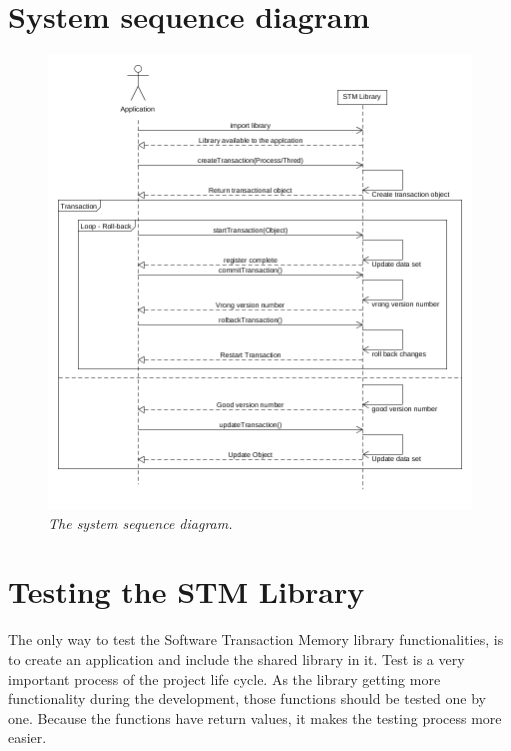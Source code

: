 \documentclass[12pt]{article}
\begin{document}
\newpage
\section{System sequence diagram}
\begin{figure}[h!]
\centering
\includegraphics[scale=0.5]{Pictures/sequence.png}
\caption{\textit{\color{gray}The system sequence diagram.}}
\end{figure}

\newpage
\section{Testing the STM Library}
The only way to test the Software Transaction Memory library functionalities, is to create an application and include the shared library in it. Test is a very important process of the project life cycle.
As the library getting more functionality during the development, those functions should be tested one by one. Because the functions have return values, it makes the testing process more easier.\\
\end{document}
